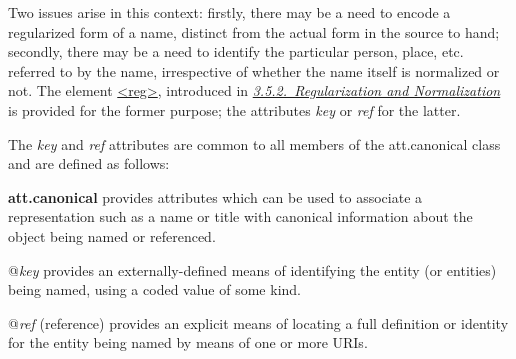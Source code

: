 Two issues arise in this context: firstly, there may be a need to encode a regularized form of a name, distinct from the actual form in the source to hand; secondly, there may be a need to identify the particular person, place, etc. referred to by the name, irrespective of whether the name itself is normalized or not. The element \hyperref[TEI.reg]{<reg>}, introduced in \textit{\hyperref[COEDREG]{3.5.2.\ Regularization and Normalization}} is provided for the former purpose; the attributes {\itshape key} or {\itshape ref} for the latter.\par
The {\itshape key} and {\itshape ref} attributes are common to all members of the \textsf{att.canonical} class and are defined as follows: 
\begin{sansreflist}
  
\item [\textbf{att.canonical}] provides attributes which can be used to associate a representation such as a name or title with canonical information about the object being named or referenced.\hfil\\[-10pt]\begin{sansreflist}
    \item[@{\itshape key}]
  provides an externally-defined means of identifying the entity (or entities) being named, using a coded value of some kind.
    \item[@{\itshape ref}]
  (reference) provides an explicit means of locating a full definition or identity for the entity being named by means of one or more URIs.
\end{sansreflist}  
\end{sansreflist}
\par
